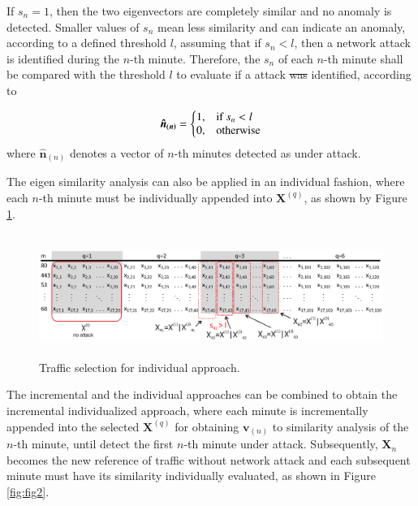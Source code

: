 \documentclass[review]{elsarticle}
\providecommand{\DIFaddtex}[1]{{\protect\color{blue}\uwave{#1}}} %
\providecommand{\DIFdeltex}[1]{{\protect\color{red}\sout{#1}}}                      %
\providecommand{\DIFaddbegin}{} %
\providecommand{\DIFaddend}{} %
\providecommand{\DIFdelbegin}{} %
\providecommand{\DIFdelend}{} %
\providecommand{\DIFadd}[1]{\texorpdfstring{\DIFaddtex{#1}}{#1}} %
\providecommand{\DIFdel}[1]{\texorpdfstring{\DIFdeltex{#1}}{}} %
\begin{document}
If $s_n = 1$, then the two eigenvectors are completely similar and no anomaly is detected. Smaller values of $s_n$ mean less similarity and can indicate an anomaly, according to a defined 
threshold $l$, assuming that if $s_n < l$, then a network attack is identified during the $n$-th minute. Therefore, the $s_n$ of each $n$-th minute shall be compared with the threshold $l$ to evaluate if a attack \DIFdelbegin \DIFdel{was }\DIFdelend \DIFaddbegin \DIFadd{is }\DIFaddend identified, according to

\begin{equation}\label{eq:eq14}
  \boldsymbol{\hat{n}_{(n)}}=\left\{
  \begin{array}{@{}ll@{}}
    1, & \text{if}\ s_n < l \\
    0, & \text{otherwise}
  \end{array}\right.
\end{equation}
where $\boldsymbol{\hat{n}}_{(n)}$ denotes a vector of $n$-th minutes detected as under attack.

The eigen similarity analysis can also be applied in an individual fashion, where each $n$-th minute must be individually appended into $\boldsymbol{X}^{(q)}$, as shown by Figure \ref{fig:fig9}.

\begin{figure}[h!]
     \includegraphics[height=4cm, width=12.4cm]{results/figures/individualized.eps}
     \caption{Traffic selection for individual approach.}
     \label{fig:fig9}
\end{figure}

The incremental and the individual approaches can be combined to obtain the incremental individualized approach, where each minute is incrementally appended into the selected $\boldsymbol{X}^{(q)}$ for obtaining $\boldsymbol{v}_{(n)}$ to similarity analysis of the $n$-th minute, until detect the first $n$-th minute under attack. Subsequently, $\boldsymbol{X}_n$ becomes the new reference of traffic without network attack and each subsequent minute must have its similarity individually evaluated, as shown in Figure \ref{fig:fig2}.
\end{document}
